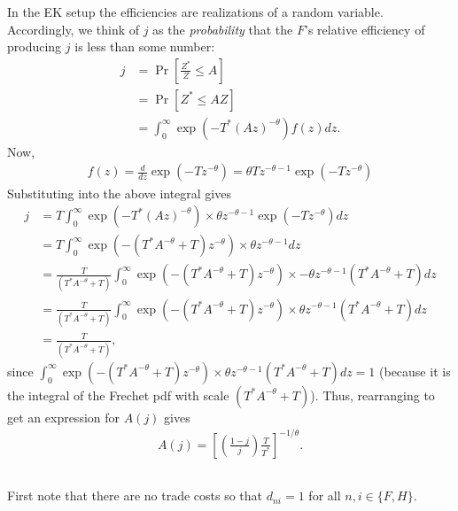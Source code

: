 \documentclass[12pt]{article}
\begin{document}
In the EK setup the efficiencies are realizations of a random variable. Accordingly, we think of $j$ as the \textit{probability} that the $F$'s relative efficiency of producing $j$ is less than some number:
\begin{align*}
j &= \Pr\left[\frac{Z^*}{Z} \leq A\right]\\
&=\Pr\left[Z^* \leq AZ\right]\\
&= \int_0^\infty \exp(-T^*(Az)^{-\theta}) f(z)dz.
\end{align*}
Now,
\begin{align*}
f(z) = \frac{d}{dz} \exp(-Tz^{-\theta}) = \theta T z^{-\theta-1}\exp(-Tz^{-\theta})
\end{align*}
Substituting into the above integral gives
\begin{align*}
j &= T\int_0^\infty \exp(-T^*(Az)^{-\theta}) \times \theta z^{-\theta-1}\exp(-Tz^{-\theta})dz\\
&=T\int_0^\infty \exp(-(T^*A^{-\theta}+T)z^{-\theta}) \times\theta z^{-\theta-1}dz\\
&= \frac{T}{(T^*A^{-\theta}+T)} \int_0^\infty \exp(-(T^*A^{-\theta}+T)z^{-\theta}) \times -\theta z^{-\theta-1}(T^*A^{-\theta}+T)dz\\
&=\frac{T}{(T^*A^{-\theta}+T)} \int_0^\infty \exp(-(T^*A^{-\theta}+T)z^{-\theta}) \times \theta z^{-\theta-1}(T^*A^{-\theta}+T)dz\\
&=\frac{T}{(T^*A^{-\theta}+T)},
\end{align*}
since $\int_0^\infty \exp(-(T^*A^{-\theta}+T)z^{-\theta}) \times \theta z^{-\theta-1}(T^*A^{-\theta}+T)dz = 1$ (because it is the integral of the Frechet pdf with scale $(T^*A^{-\theta}+T)$). Thus, rearranging to get an expression for $A(j)$ gives
\begin{align*}
A(j) = \left[\left(\frac{1-j}{j}\right)\frac{T}{T^*}\right]^{-1/\theta}.
\end{align*}

\newpage

\subsection{}
First note that there are no trade costs so that $d_{ni} = 1$ for all $n,i \in \{F,H\}$.\\
\end{document}
